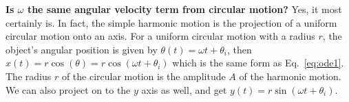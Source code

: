 \begin{common-question}
  \textbf{Is $\omega$ the same angular velocity term from circular motion?}
  Yes, it most certainly is. In fact, the simple harmonic motion is the
  projection of a uniform circular motion onto an axis. For a uniform circular
  motion with a radius $r$, the object's angular position is given by
  $\theta(t)=\omega t+\theta_i$, then
  $x(t)=r\cos(\theta)=r\cos(\omega t+\theta_i)$ which is the same form as
  Eq.~\ref{eq:ode1}. The radius $r$ of the circular motion is the amplitude
  $A$ of the harmonic motion. We can also project on to the $y$ axis as well,
  and get $y(t)=r\sin(\omega t +\theta_i)$.
  \begin{center}
  \end{center}
\end{common-question}


